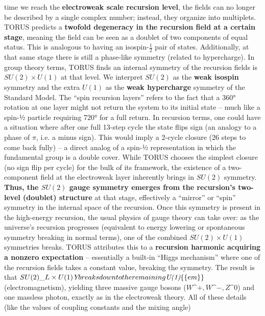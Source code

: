 \documentclass[]{article}
\begin{document}
\begin{itemize}
  time we reach the \textbf{electroweak scale recursion level}, the
  fields can no longer be described by a single complex number; instead,
  they organize into multiplets. TORUS predicts a \textbf{twofold
  degeneracy in the recursion field at a certain stage}, meaning the
  field can be seen as a doublet of two components of equal status​.
  This is analogous to having an
  isospin-$\frac{1}{2}$ pair of states.
  Additionally, at that same stage there is still a phase-like symmetry
  (related to hypercharge). In group theory terms, TORUS finds an
  internal symmetry of the recursion fields is \textbf{$SU(2)
  \times U(1)$} at that
  level​. We interpret $SU(2)$ as the
  \textbf{weak isospin} symmetry and the extra $U(1)$ as the
  \textbf{weak hypercharge} symmetry of the Standard Model. The ``spin
  recursion layers'' refers to the fact that a 360° rotation at one
  layer might not return the system to its initial state -- much like a
  spin-½ particle requiring 720° for a full return. In recursion terms,
  one could have a situation where after one full 13-step cycle the
  state flips sign (an analogy to a phase of $\pi$,
  i.e. a minus sign)​. This would imply a 2-cycle closure (26 steps to
  come back fully) -- a direct analog of a spin-½ representation in
  which the fundamental group is a double cover. While TORUS chooses the
  simplest closure (no sign flip per cycle) for the bulk of its
  framework, the existence of a two-component field at the electroweak
  layer inherently brings in $SU(2)$ symmetry. \textbf{Thus, the
  $SU(2)$ gauge symmetry emerges from the recursion's two-level
  (doublet) structure} at that stage, effectively a ``mirror'' or
  ``spin'' symmetry in the internal space of the recursion​. Once this
  symmetry is present in the high-energy recursion, the usual physics of
  gauge theory can take over: as the universe's recursion progresses
  (equivalent to energy lowering or spontaneous symmetry breaking in
  normal terms), one of the combined $SU(2)\times U(1)$
  symmetries breaks. TORUS attributes this to a \textbf{recursion
  harmonic acquiring a nonzero expectation} -- essentially a built-in
  ``Higgs mechanism'' where one of the recursion fields takes a constant
  value, breaking the symmetry​. The result is that $SU(2)\_L
  \times U(1)\emph{Y$ breaks down to the remaining
  $U(1)}\{\text\{em\}\}$ (electromagnetism), yielding
  three massive gauge bosons ($W\^{}+, W\^{}-, Z\^{}0$) and one
  massless photon, exactly as in the electroweak theory​. All of these
  details (like the values of coupling constants and the mixing angle)

\end{itemize}
\end{document}
